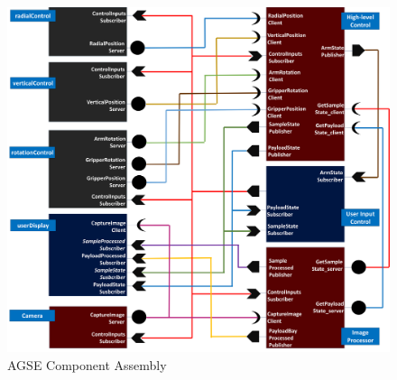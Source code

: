 \begin{figure}[h]
	\centering
        \includegraphics[width=\textwidth]{Figures/AGSE-Deployment.png}
	\caption{AGSE Component Assembly}
	\label{fig:AGSE}
\end{figure}

